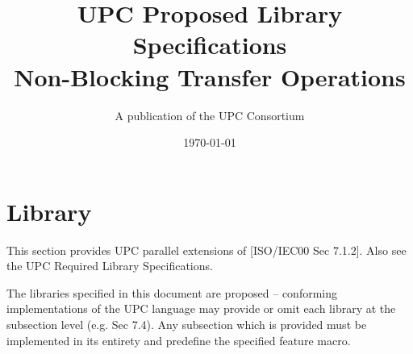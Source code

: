 \newcommand{\myspecversion}{Version 1.3}
\newcommand{\mydraftversion}{Draft 3.1}
\newcommand{\myversion}{\specversion}
\newcommand{\mytitle}{UPC Proposed Library Specifications\\
                      Non-Blocking Transfer Operations}


\makeindex

\title{\mytitle\\
\myversion}

\author{A publication of the UPC Consortium}

\date{\today}



\maketitle

\setcounter{page}{2}
\dotoc

\setcounter{section}{6} %
\section{Library}

\npf This section provides UPC parallel extensions of [ISO/IEC00 Sec 7.1.2].
Also see the UPC Required Library Specifications.

\np The libraries specified in this document are proposed --
conforming implementations of the UPC language may provide or 
omit each library at the subsection level (e.g. Sec 7.4). 
Any subsection which is provided must be implemented in its
entirety and predefine the specified feature macro.

\setcounter{subsection}{3} %


\doindex

